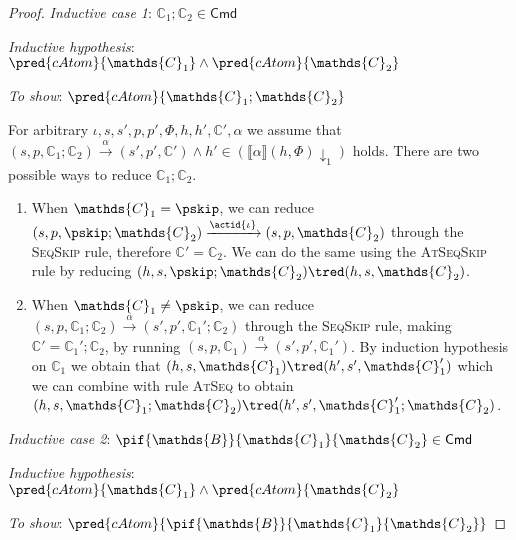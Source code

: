 \begin{lem}
{\begin{proof}
	\textit{Inductive case 1}: $\mathds{C}_1 ; \mathds{C}_2 \in \mathsf{Cmd}$
	
	\textit{Inductive hypothesis}: $\pred{cAtom}{\mathds{C}_1} \land \pred{cAtom}{\mathds{C}_2}$
	
	\textit{To show}: $\pred{cAtom}{\mathds{C}_1 ; \mathds{C}_2}$
	
	For arbitrary $\iota, s, s', p, p', \Phi, h, h', \mathds{C}', \alpha$ we assume that $(s, p, \mathds{C}_1 ; \mathds{C}_2) \xrightarrow{\alpha} (s', p', \mathds{C}') \land h' \in \left( \llbracket \alpha \rrbracket(h, \Phi) \downarrow_1 \right)$ holds. There are two possible ways to reduce $\mathds{C}_1 ; \mathds{C}_2$.
	\begin{enumerate}
	\item When $\mathds{C}_1 = \pskip$, we can reduce $(s, p, \pskip ; \mathds{C}_2) \xrightarrow{\actid{\iota}} (s, p, \mathds{C}_2)$ through the \textsc{SeqSkip} rule, therefore $\mathds{C}' = \mathds{C}_2$. We can do the same using the \textsc{AtSeqSkip} rule by reducing $(h, s, \pskip ; \mathds{C}_2) \tred (h, s, \mathds{C}_2)$.
	\item When $\mathds{C}_1 \neq \pskip$, we can reduce $(s, p, \mathds{C}_1 ; \mathds{C}_2) \xrightarrow{\alpha} (s', p', \mathds{C}_1' ; \mathds{C}_2)$ through the \textsc{SeqSkip} rule, making $\mathds{C}' = \mathds{C}_1'; \mathds{C}_2$, by running $(s, p, \mathds{C}_1) \xrightarrow{\alpha} (s', p', \mathds{C}_1')$. By induction hypothesis on $\mathds{C}_1$ we obtain that $(h, s, \mathds{C}_1) \tred (h', s', \mathds{C}_1')$ which we can combine with rule \textsc{AtSeq} to obtain $(h, s, \mathds{C}_1 ; \mathds{C}_2) \tred (h', s', \mathds{C}_1' ; \mathds{C}_2)$. \\
	\end{enumerate}
	
	\textit{Inductive case 2}: $\pif{\mathds{B}}{\mathds{C}_1}{\mathds{C}_2} \in \mathsf{Cmd}$
	
	\textit{Inductive hypothesis}: $\pred{cAtom}{\mathds{C}_1} \land \pred{cAtom}{\mathds{C}_2}$
	
	\textit{To show}: $\pred{cAtom}{\pif{\mathds{B}}{\mathds{C}_1}{\mathds{C}_2}}$
	

\end{proof}}
\end{lem}
